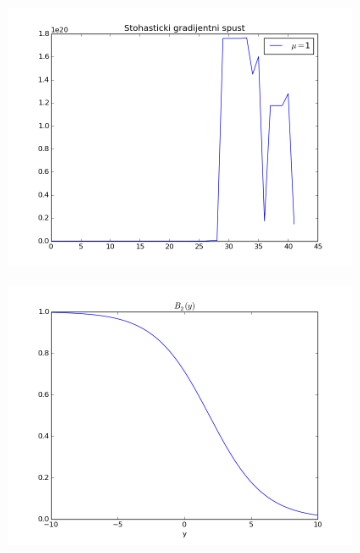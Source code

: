 \documentclass[paper=a4, fontsize=11pt]{scrartcl} %
\numberwithin{equation}{section} %
\numberwithin{figure}{section} %
\numberwithin{table}{section} %
\begin{document}
\begin{figure}[h]
\begin{subfigure}[b]{0.45\textwidth}
\includegraphics[width=\textwidth]{img/figure_3.png}
\end{subfigure}
\begin{subfigure}[b]{0.45\textwidth}
\includegraphics[width=\textwidth]{img/figure_4.png}
\end{subfigure}


\end{figure}
\end{document}

